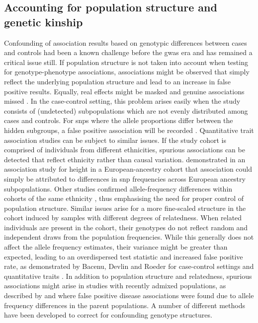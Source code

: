 \subsection{Accounting for population structure and genetic kinship}
\label{subsection:population-structure}

Confounding of association results based on genotypic differences between cases and controls had been a known challenge before the \gls{gwas} era \citep{Spielman1993} and has remained a critical issue still. If population structure is not taken into account when testing for genotype-phenotype associations, associations might be observed that simply reflect the underlying population structure and lead to an increase in false positive results. Equally, real effects might be masked and genuine associations missed \citep{Marchini2004}. In the case-control setting, this problem arises easily when the study consists of (undetected) subpopulations which are not evenly distributed among cases and controls. For \glspl{snp} where the allele proportions differ between the hidden subgroups, a false positive association will be recorded \citep{Marchini2004,Balding2006}. Quantitative trait association studies can be subject to similar issues. If the study cohort is comprised of individuals from different ethnicities, spurious associations can be detected that reflect ethnicity rather than causal variation. \citet{Campbell2005} demonstrated in an association study for height in a European-ancestry cohort that association could simply be attributed to differences in \gls{snp} frequencies across European ancestry subpopulations.  Other studies confirmed allele-frequency differences within cohorts of the same ethnicity \citep{Tian2008a,Tian2008b}, thus emphasising the need for proper control of population structure. Similar issues arise for a more fine-scaled structure in the cohort induced by samples with different degrees of relatedness. When related individuals are present in the cohort, their genotypes do not reflect random and independent draws from the population frequencies. While this generally does not affect the allele frequency estimates, their variance might be greater than expected, leading to an overdispersed test statistic and increased false positive rate, as demonstrated by Bacenu, Devlin and Roeder for case-control settings and quantitative traits \citep{Devlin1999, Bacanu2002}. In addition to population structure and relatedness, spurious associations might arise in studies with recently admixed populations, as described by \citet{Lander1994} and \citet{Ewens1995} where false positive disease associations were found due to allele frequency differences in the parent populations. A number of different methods have been developed to correct for confounding genotype structures.

